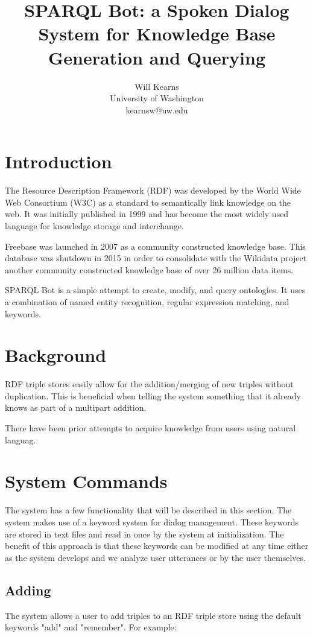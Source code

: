 \documentclass[11pt]{article}
\title{SPARQL Bot: a Spoken Dialog System for Knowledge Base Generation and Querying}
\author{Will Kearns \\ 
University of Washington \\ 
kearnsw@uw.edu}
\begin{document}
\maketitle

\section{Introduction}
The Resource Description Framework (RDF) was developed by the World Wide Web Consortium (W3C) as a standard to semantically link knowledge on the web. It was initially published in 1999 and has become the most widely used language for knowledge storage and interchange.
 
Freebase was launched in 2007 as a community constructed knowledge base. \cite{freebase} This database was shutdown in 2015 in order to consolidate with the Wikidata project another community constructed knowledge base of over 26 million data items.

SPARQL Bot is a simple attempt to create, modify, and query ontologies. It uses a combination of named entity recognition, regular expression matching, and keywords. 

\section{Background}
RDF triple stores easily allow for the addition/merging of new triples without duplication. This is beneficial when telling the system something that it already knows as part of a multipart addition.

There have been prior attempts to acquire knowledge from users using natural languag. \cite{Pappu2014}

\section{System Commands}
The system has a few functionality that will be described in this section. The system makes use of a keyword system for dialog management. These keywords are stored in text files and read in once by the system at initialization. The benefit of this approach is that these keywords can be modified at any time either as the system develops and we analyze user utterances or by the user themselves.
 
\subsection{Adding}
The system allows a user to add triples to an RDF triple store using the default keywords "add" and "remember". For example:
\end{document}
